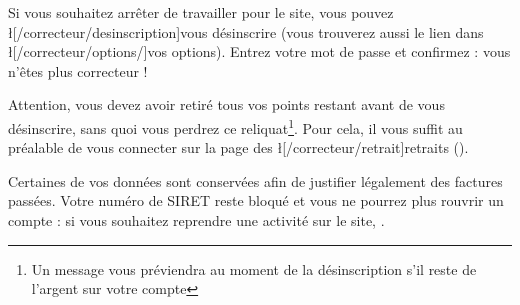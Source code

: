 ﻿Si vous souhaitez arrêter de travailler pour le site, vous pouvez \l[/correcteur/desinscription]{vous désinscrire} (vous trouverez aussi le lien dans \l[/correcteur/options/]{vos options}).
Entrez votre mot de passe et confirmez : vous n'êtes plus correcteur !

Attention, vous devez avoir retiré tous vos points restant avant de vous désinscrire, sans quoi vous perdrez ce reliquat\footnote{Un message vous préviendra au moment de la désinscription s'il reste de l'argent sur votre compte \eDevoir}. Pour cela, il vous suffit au préalable de vous connecter sur la page des \l[/correcteur/retrait]{retraits} ().

Certaines de vos données sont conservées afin de justifier légalement des factures passées. Votre numéro de SIRET reste bloqué et vous ne pourrez plus rouvrir un compte : si vous souhaitez reprendre une activité sur le site, .